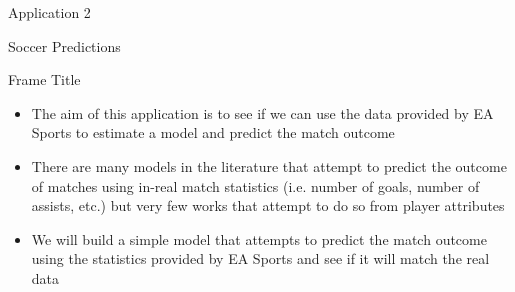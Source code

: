 \documentclass[aspectratio=169,xcolor=dvipsnames]{beamer}
\begin{document}
\begin{frame}{}
    \centering
    \begin{Large}
    Application 2\\
    \end{Large}
    \vspace{0.5cm}
    \begin{Huge}
    Soccer Predictions
    \end{Huge}
\end{frame}


\begin{frame}{Frame Title}
\begin{itemize}
    
    \item The aim of this application is to see if we can use the data provided by EA Sports to estimate a model and predict the match outcome
    
    \item There are many models in the literature that attempt to predict the outcome of matches using in-real match statistics (i.e. number of goals, number of assists, etc.) but very few works that attempt to do so from player attributes
    
    \item We will build a simple model that attempts to predict the match outcome using the statistics provided by EA Sports and see if it will match the real data
\end{itemize}

\end{frame}

\end{document}
